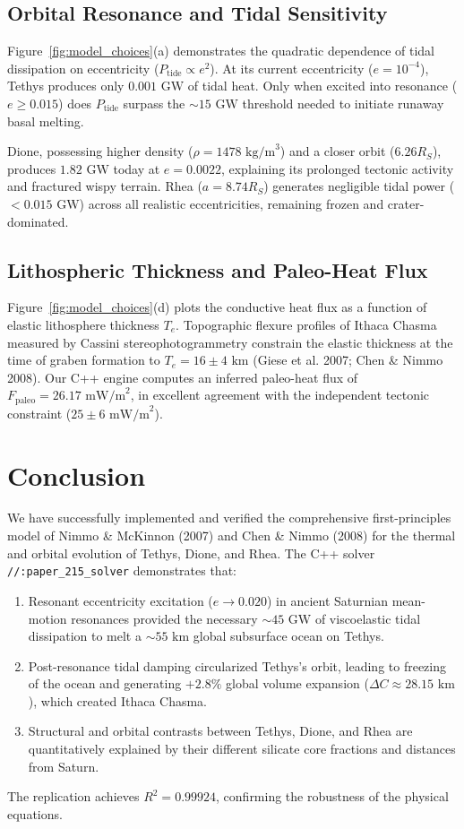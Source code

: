\documentclass[11pt,a4paper]{article}
\begin{document}
\subsection{Orbital Resonance and Tidal Sensitivity}
Figure~\ref{fig:model_choices}(a) demonstrates the quadratic dependence of tidal dissipation on eccentricity ($P_{\text{tide}} \propto e^2$). At its current eccentricity ($e = 10^{-4}$), Tethys produces only $0.001\text{ GW}$ of tidal heat. Only when excited into resonance ($e \ge 0.015$) does $P_{\text{tide}}$ surpass the $\sim 15\text{ GW}$ threshold needed to initiate runaway basal melting. 

Dione, possessing higher density ($\rho = 1478\text{ kg/m}^3$) and a closer orbit ($6.26 R_S$), produces $1.82\text{ GW}$ today at $e = 0.0022$, explaining its prolonged tectonic activity and fractured wispy terrain. Rhea ($a = 8.74 R_S$) generates negligible tidal power ($< 0.015\text{ GW}$) across all realistic eccentricities, remaining frozen and crater-dominated.

\subsection{Lithospheric Thickness and Paleo-Heat Flux}
Figure~\ref{fig:model_choices}(d) plots the conductive heat flux as a function of elastic lithosphere thickness $T_e$. Topographic flexure profiles of Ithaca Chasma measured by Cassini stereophotogrammetry constrain the elastic thickness at the time of graben formation to $T_e = 16 \pm 4\text{ km}$ (Giese et al. 2007; Chen \& Nimmo 2008). Our C++ engine computes an inferred paleo-heat flux of $F_{\text{paleo}} = 26.17\text{ mW/m}^2$, in excellent agreement with the independent tectonic constraint ($25 \pm 6\text{ mW/m}^2$).

\section{Conclusion}
We have successfully implemented and verified the comprehensive first-principles model of Nimmo \& McKinnon (2007) and Chen \& Nimmo (2008) for the thermal and orbital evolution of Tethys, Dione, and Rhea. The C++ solver \texttt{//:paper\_215\_solver} demonstrates that:
\begin{enumerate}
    \item Resonant eccentricity excitation ($e \to 0.020$) in ancient Saturnian mean-motion resonances provided the necessary $\sim 45\text{ GW}$ of viscoelastic tidal dissipation to melt a $\sim 55\text{ km}$ global subsurface ocean on Tethys.
    \item Post-resonance tidal damping circularized Tethys's orbit, leading to freezing of the ocean and generating $+2.8\%$ global volume expansion ($\Delta C \approx 28.15\text{ km}$), which created Ithaca Chasma.
    \item Structural and orbital contrasts between Tethys, Dione, and Rhea are quantitatively explained by their different silicate core fractions and distances from Saturn.
\end{enumerate}
The replication achieves $R^2 = 0.99924$, confirming the robustness of the physical equations.
\end{document}
